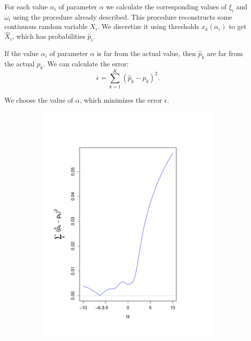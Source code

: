 \documentclass[10pt]{article}
\begin{document}
For each value $\alpha_{i}$ of parameter $\alpha$ we calculate the corresponding values of $\xi_{i}$ and $\omega_{i}$ using the procedure already described. This procedure reconstructs some continuous random variable $X_{i}$. We discretize it using thresholds $x_{k}(\alpha_{i})$ to get $\hat{X}_{i}$, which has probabilities $\hat{p}_{i}$.

If the value $\alpha_{i}$ of parameter $\alpha$ is far from the actual value, then $\hat{p}_{k}$ are far from the actual $p_{k}$. We can calculate the error: 
\begin{equation}
\epsilon = \sum_{k=1}^{K} (\hat{p}_{k} - p_{k})^{2}.
\end{equation}

We choose the value of $\alpha$, which minimizes the error $\epsilon$. 

\begin{figure}[H]
\centering
\begin{subfigure}{.25\textwidth}
  \centering
  \includegraphics[width=\linewidth]{alpha_trace_-6_3.pdf}

\end{subfigure}
\end{figure}
\end{document}
